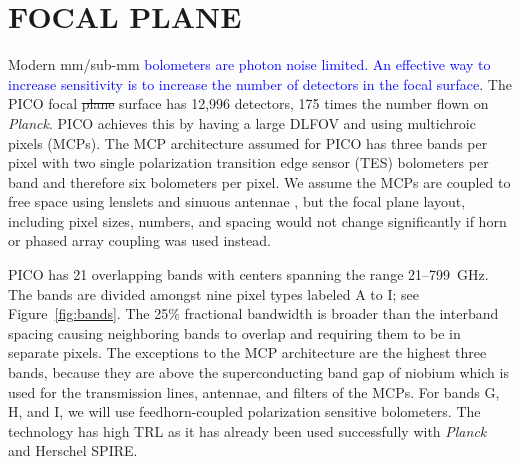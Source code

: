 \documentclass[]{spie}  %
\newcommand{\comr}[1]{\textcolor{red}{#1}}
\newcommand{\comb}[1]{\textcolor{blue}{#1}}
\begin{document}


\section{FOCAL PLANE}
\label{sec:focalplane}

Modern mm/sub-mm \comb{bolometers are photon noise limited. An 
effective way to increase sensitivity is to increase the number of detectors in the focal surface}. 
The PICO focal \sout{plane} surface has 12,996 detectors, 175 times the number flown on \textit{Planck}. PICO achieves this by 
having a large DLFOV and using multichroic pixels (MCPs)\cite{Suzuki2014_samps,datta2014_mcp}. 
The MCP architecture assumed for PICO has three bands per pixel with two single polarization transition 
edge sensor (TES) bolometers per band and therefore six bolometers per pixel. 
We assume the MCPs are coupled to free space using lenslets and sinuous antennae \cite{Suzuki2014_samps}, 
but the focal plane layout, including pixel sizes, numbers, and spacing would not change significantly 
if horn or phased array coupling was used instead.

PICO has 21 overlapping bands with centers spanning the range 21--799~GHz. The bands are divided amongst 
nine pixel types labeled A to I; see Figure~\ref{fig:bands}. 
The 25\% fractional bandwidth is broader than the interband spacing causing neighboring bands to 
overlap and requiring them to be in separate pixels. 
The exceptions to the MCP architecture are the highest three bands, because they are above the superconducting 
band gap of niobium which is used for the transmission lines, antennae, and filters of the MCPs.  
For bands G, H, and I, we will use feedhorn-coupled polarization sensitive bolometers. The technology has high TRL 
as it has already been used successfully with 
\textit{Planck}\cite{planck2010_hfi} and Herschel SPIRE\cite{spire2010}.
\end{document}
